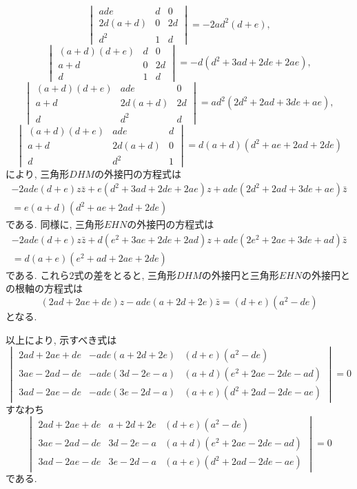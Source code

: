 \begin{ifsol*}
\[\begin{vmatrix}
ade&d&0\\
2d(a+d)&0&2d\\
d^2&1&d
\end{vmatrix}=-2ad^2(d+e),\]
\[\begin{vmatrix}
(a+d)(d+e)&d&0\\
a+d&0&2d\\
d&1&d
\end{vmatrix}=-d(d^2+3ad+2de+2ae),\]
\[\begin{vmatrix}
(a+d)(d+e)&ade&0\\
a+d&2d(a+d)&2d\\
d&d^2&d
\end{vmatrix}=ad^2(2d^2+2ad+3de+ae),\]
\[\begin{vmatrix}
(a+d)(d+e)&ade&d\\
a+d&2d(a+d)&0\\
d&d^2&1
\end{vmatrix}=d(a+d)(d^2+ae+2ad+2de)\]
により, 三角形$DHM$の外接円の方程式は
\begin{align*}
-2ade(d+e)z\bar z+e(d^2+3ad+2de+2ae)z+ade(2d^2+2ad+3de+ae)\bar z\\
=e(a+d)(d^2+ae+2ad+2de)
\end{align*}
である.
同様に, 三角形$EHN$の外接円の方程式は
\begin{align*}
-2ade(d+e)z\bar z+d(e^2+3ae+2de+2ad)z+ade(2e^2+2ae+3de+ad)\bar z\\
=d(a+e)(e^2+ad+2ae+2de)
\end{align*}
である.
これら$2$式の差をとると, 三角形$DHM$の外接円と三角形$EHN$の外接円との根軸の方程式は
\[(2ad+2ae+de)z-ade(a+2d+2e)\bar z=(d+e)(a^2-de)\]
となる.

以上により, 示すべき式は
\[\begin{vmatrix}
2ad+2ae+de&-ade(a+2d+2e)&(d+e)(a^2-de)\\
3ae-2ad-de&-ade(3d-2e-a)&(a+d)(e^2+2ae-2de-ad)\\
3ad-2ae-de&-ade(3e-2d-a)&(a+e)(d^2+2ad-2de-ae)
\end{vmatrix}=0\]
すなわち
\[\begin{vmatrix}
2ad+2ae+de&a+2d+2e&(d+e)(a^2-de)\\
3ae-2ad-de&3d-2e-a&(a+d)(e^2+2ae-2de-ad)\\
3ad-2ae-de&3e-2d-a&(a+e)(d^2+2ad-2de-ae)
\end{vmatrix}=0\]
である.


\end{ifsol*}
